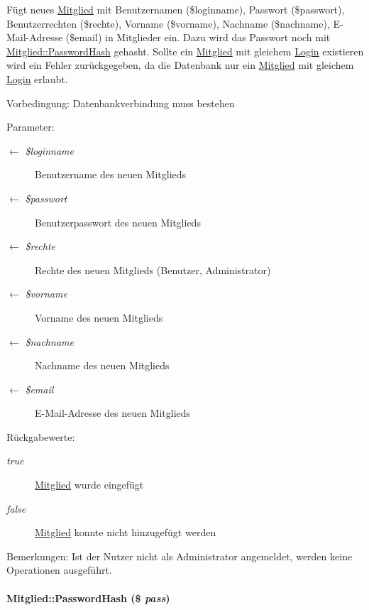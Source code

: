 Fügt neues \hyperlink{classMitglied}{Mitglied} mit Benutzernamen (\$loginname), Passwort (\$passwort), Benutzerrechten (\$rechte), Vorname (\$vorname), Nachname (\$nachname), E-Mail-Adresse (\$email) in Mitglieder ein. Dazu wird das Passwort noch mit \hyperlink{classMitglied_9b13db80866c22bf992e73f2eb75e369}{Mitglied::Password\-Hash} gehasht. Sollte ein \hyperlink{classMitglied}{Mitglied} mit gleichem \hyperlink{classLogin}{Login} existieren wird ein Fehler zurückgegeben, da die Datenbank nur ein \hyperlink{classMitglied}{Mitglied} mit gleichem \hyperlink{classLogin}{Login} erlaubt. \begin{Desc}
\item[Vorbedingung:]Datenbankverbindung muss bestehen \end{Desc}
\begin{Desc}
\item[Parameter:]
\begin{description}
\item[\mbox{$\leftarrow$} {\em \$loginname}]Benutzername des neuen Mitglieds \item[\mbox{$\leftarrow$} {\em \$passwort}]Benutzerpasswort des neuen Mitglieds \item[\mbox{$\leftarrow$} {\em \$rechte}]Rechte des neuen Mitglieds (Benutzer, Administrator) \item[\mbox{$\leftarrow$} {\em \$vorname}]Vorname des neuen Mitglieds \item[\mbox{$\leftarrow$} {\em \$nachname}]Nachname des neuen Mitglieds \item[\mbox{$\leftarrow$} {\em \$email}]E-Mail-Adresse des neuen Mitglieds \end{description}
\end{Desc}
\begin{Desc}
\item[R\"{u}ckgabewerte:]
\begin{description}
\item[{\em true}]\hyperlink{classMitglied}{Mitglied} wurde eingefügt \item[{\em false}]\hyperlink{classMitglied}{Mitglied} konnte nicht hinzugefügt werden \end{description}
\end{Desc}
\begin{Desc}
\item[Bemerkungen:]Ist der Nutzer nicht als Administrator angemeldet, werden keine Operationen ausgeführt. \end{Desc}
\hypertarget{classMitglied_9b13db80866c22bf992e73f2eb75e369}{
\paragraph[PasswordHash]{\setlength{\rightskip}{0pt plus 5cm}Mitglied::Password\-Hash (\$ {\em pass})}\hfill}
\label{classMitglied_9b13db80866c22bf992e73f2eb75e369}


